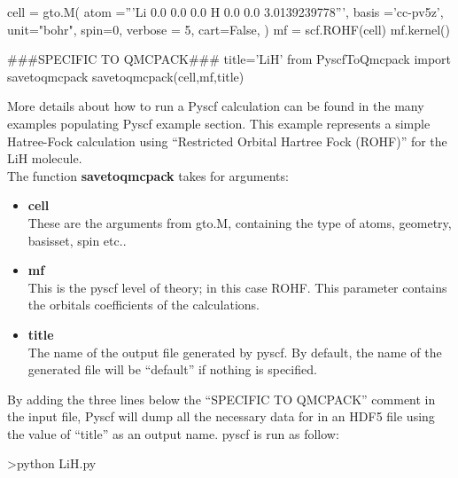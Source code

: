 \begin{itemize}
\begin{itemize}
\begin{shade}
cell = gto.M(
   atom ='''Li  0.0 0.0 0.0
            H   0.0 0.0 3.0139239778''',                                                                                               
   basis ='cc-pv5z',                                                                                                                   
   unit="bohr",                                                                                                                        
   spin=0,
   verbose = 5,
   cart=False,
) 
mf = scf.ROHF(cell)
mf.kernel()

###SPECIFIC TO QMCPACK###
title='LiH'                                                                                                                            
from PyscfToQmcpack import savetoqmcpack                                                                                               
savetoqmcpack(cell,mf,title)    
 
 \end{shade}
More details about how to run a Pyscf calculation can be found in the many examples populating Pyscf example section. This example represents a simple Hatree-Fock calculation using ``Restricted Orbital Hartree Fock (ROHF)'' for the LiH molecule.\\
The function \textbf{savetoqmcpack} takes for arguments:\\
\begin{itemize}
 \item \textbf{cell}\\
 These are the arguments from gto.M, containing the type of atoms, geometry, basisset, spin etc.. \\
 \item \textbf{mf}\\
This is the pyscf level of theory; in this case ROHF. This parameter contains the orbitals coefficients of the calculations. \\
 \item \textbf{title}\\
 The name of the output file generated by pyscf. By default, the name of the generated file will be ``default'' if nothing is specified.\\
 \end{itemize}

By adding the three lines below the ``SPECIFIC TO QMCPACK'' comment  in the input file, Pyscf will dump all the necessary data for \qmcpack in an HDF5 file using the value of ``title'' as an output name. pyscf is run as follow:\\
\begin{shade}
 >python LiH.py
\end{shade}



\end{itemize}
\end{itemize}
